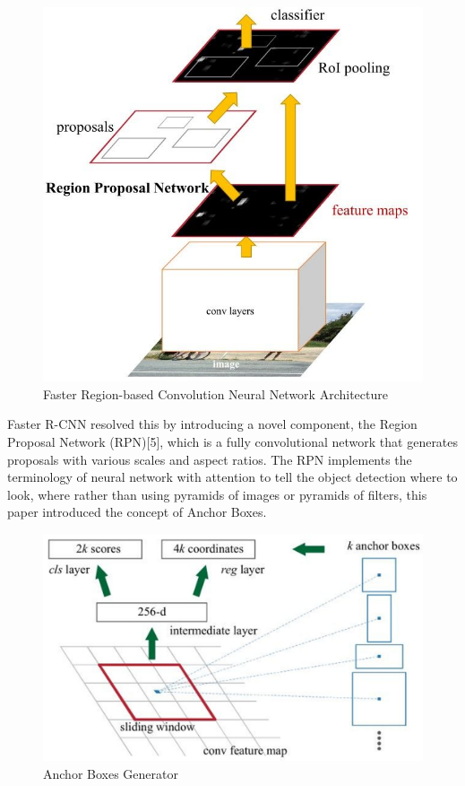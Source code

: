 \begin{figure}[h!]
    \centering
    \includegraphics[scale=0.4]{Figures/faster-rcnn.jpeg}
    \caption{Faster Region-based Convolution Neural Network Architecture}
    \label{fig:faster-rcnn}
\end{figure}

Faster R-CNN resolved this by introducing a novel component, the Region Proposal Network (RPN)[5], which is a fully convolutional network that generates proposals 
with various scales and aspect ratios. The RPN implements the terminology of neural network with attention to tell the object detection where to look, 
where rather than using pyramids of images or pyramids of filters, this paper introduced the concept of Anchor Boxes. 

\begin{figure}
    \centering
    \includegraphics[scale=0.1]{Figures/anchors.jpeg}
    \caption{Anchor Boxes Generator}
    \label{fig:anchors}
\end{figure}

